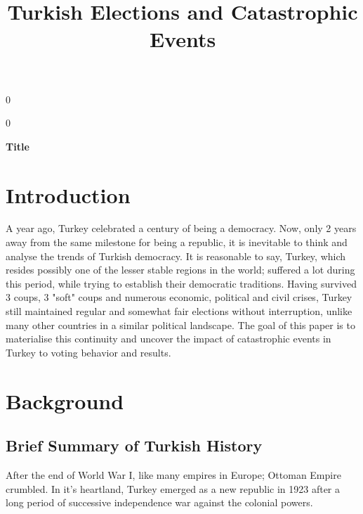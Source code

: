 \documentclass[12pt]{article}
\newcommand{\blind}{0}
\begin{document}
%

\def\spacingset#1{\renewcommand{\baselinestretch}%
{#1}\small\normalsize} \spacingset{1}



\blind
{
  \title{\bf Turkish Elections and Catastrophic Events}
    {
}

  \maketitle
} \fi

\blind
{
  \bigskip
  \bigskip
  \bigskip
  \begin{center}
    {\LARGE\bf Title}
\end{center}
  \medskip
} \fi

\spacingset{1.45} %
\section{Introduction}
\label{sec:intro}

A year ago, Turkey celebrated a century of being a democracy. Now, only 2 years away from the same milestone for being a republic, it is inevitable to think and analyse the trends of Turkish democracy. 
It is reasonable to say, Turkey, which resides possibly one of the lesser stable regions in the world; suffered a lot during this period, while trying to establish their democratic traditions. Having survived 3 coups, 3 "soft" coups and numerous economic, political and civil crises, Turkey still maintained regular and somewhat fair elections without interruption, unlike many other countries in a similar political landscape. The goal of this paper is to materialise this continuity and uncover the impact of catastrophic events in Turkey to voting behavior and results. 

\section{Background}

\subsection{Brief Summary of Turkish History}

After the end of World War I, like many empires in Europe; Ottoman Empire crumbled. In it's heartland, Turkey emerged as a new republic in 1923 after a long period of successive independence war against the colonial powers. 
\end{document}
